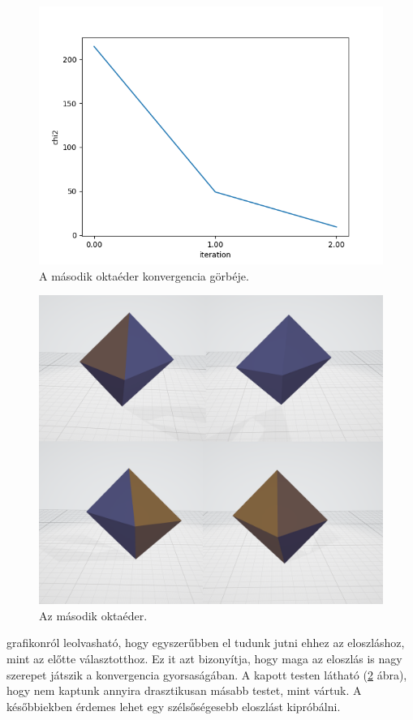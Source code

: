 \begin{figure}[h!]
	\centering
	\includegraphics[scale=0.7]{images/octahedron_02.png}
	\caption{A második oktaéder konvergencia görbéje.}
	\label{fig:octa02}
\end{figure}

\begin{figure}[h!]
	\centering
	\includegraphics[width=\textwidth]{images/octa02obj.png}
	\caption{Az második oktaéder.}
	\label{fig:octa02obj}
\end{figure}

 grafikonról leolvasható, hogy egyszerűbben el tudunk jutni ehhez az eloszláshoz, mint az előtte választotthoz.
Ez it azt bizonyítja, hogy maga az eloszlás is nagy szerepet játszik a konvergencia gyorsaságában.
A kapott testen látható (\ref{fig:octa02obj} ábra), hogy nem kaptunk annyira drasztikusan másabb testet, mint vártuk.
A későbbiekben érdemes lehet egy szélsőségesebb eloszlást kipróbálni.